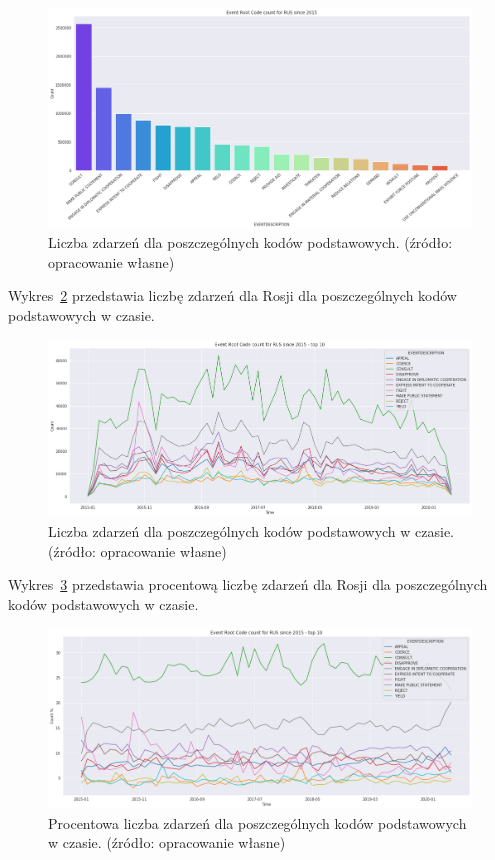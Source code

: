 \documentclass[11pt]{report}
\begin{document}
    \begin{figure}[!htp]
        \centering
        \includegraphics[width=\linewidth]{fig/RUS/RUSERC.png}
        \caption{Liczba zdarzeń dla poszczególnych kodów podstawowych. (źródło: opracowanie własne)}
        \label{fig:RUSPERC}
    \end{figure}

    Wykres~\ref{fig:RUSPERCinTIME} przedstawia liczbę zdarzeń dla Rosji dla poszczególnych kodów podstawowych w czasie.
    \begin{figure}[!htp]
        \centering
        \includegraphics[width=\linewidth]{fig/RUS/RUSERCinTIME.png}
        \caption{Liczba zdarzeń dla poszczególnych kodów podstawowych w czasie. (źródło: opracowanie własne)}
        \label{fig:RUSPERCinTIME}
    \end{figure}

    Wykres~\ref{fig:RUSPERCpercinTIME} przedstawia procentową liczbę zdarzeń dla Rosji dla poszczególnych kodów podstawowych w czasie.
    \begin{figure}[!htp]
        \centering
        \includegraphics[width=\linewidth]{fig/RUS/RUSERCpercinTIME.png}
        \caption{Procentowa liczba zdarzeń dla poszczególnych kodów podstawowych w czasie. (źródło: opracowanie własne)}
        \label{fig:RUSPERCpercinTIME}
    \end{figure}
\end{document}
